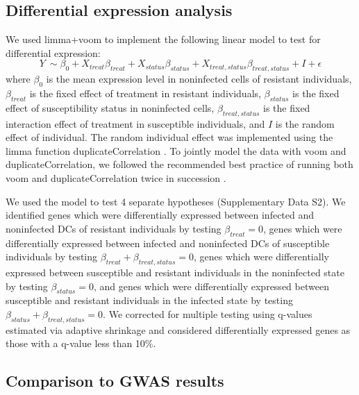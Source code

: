 \documentclass[fleqn,10pt]{wlscirep}
\begin{document}
\subsection*{Differential expression analysis}

We used limma+voom \cite{Smyth2004, Law2014, Ritchie2015} to implement
the following linear model to test for differential expression:
\begin{equation} \label{eq:limma}
Y\ \sim \beta_{0} + X_{treat}\beta_{treat} + X_{status}\beta_{status} + X_{treat,status}\beta_{treat,status} + I + \epsilon
\end{equation}
where $\beta_{0}$ is the mean expression level in noninfected cells of
resistant individuals, $\beta_{treat}$ is the fixed effect of
treatment in resistant individuals, $\beta_{status}$ is the fixed
effect of susceptibility status in noninfected cells,
$\beta_{treat,status}$ is the fixed interaction effect of treatment in
susceptible individuals, and $I$ is the random effect of individual.
The random individual effect was implemented using the limma function
duplicateCorrelation \cite{Smyth2005}. To jointly model the data with
voom and duplicateCorrelation, we followed the recommended best
practice of running both voom and duplicateCorrelation twice in
succession \cite{Liu2015}.

We used the model to test 4 separate hypotheses (Supplementary Data
S2). We identified genes which were differentially expressed between
infected and noninfected DCs of resistant individuals by testing
$\beta_{treat} = 0$, genes which were differentially expressed between
infected and noninfected DCs of susceptible individuals by testing
$\beta_{treat} + \beta_{treat,status} = 0$, genes which were
differentially expressed between susceptible and resistant individuals
in the noninfected state by testing $\beta_{status} = 0$, and genes
which were differentially expressed between susceptible and resistant
individuals in the infected state by testing $\beta_{status} +
\beta_{treat,status} = 0$. We corrected for multiple testing using
q-values estimated via adaptive shrinkage \cite{Stephens2016} and
considered differentially expressed genes as those with a q-value less
than 10\%.
\subsection*{Comparison to GWAS results}
\end{document}

